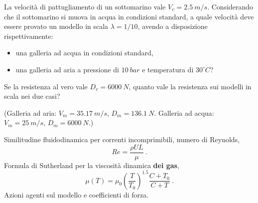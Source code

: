 \noindent
\begin{exerciseS}
La velocit\`{a} di pattugliamento di un sottomarino vale $V_v = 2.5\ m/s$.
Considerando che il sottomarino si muova in acqua in condizioni standard, a quale velocit\`{a}
deve essere provato un modello in scala $\lambda = 1/10$, avendo a disposizione
rispettivamente:
\begin{itemize}
  \item una galleria ad acqua in condizioni standard,
  \item una galleria ad aria a pressione di $10 \ bar$ e temperatura di 
        $30^\circ  C$?
\end{itemize}

Se la resistenza al vero vale $D_v=6000\ N$, quanto vale la resistenza sui
modelli in scala nei due casi?

(Galleria ad aria: $V_m = 35.17\  m/s$, $D_m = 136.1\ N$. 
 Galleria ad acqua: $V_m = 25\  m/s$, $D_m = 6000\ N$.)
\end{exerciseS}

\sol

\partone
Similitudine fluidodinamica per correnti incomprimibili, numero di Reynolds,\vspace{-0.5cm}
\begin{equation}
 Re = \frac{\rho U L}{\mu} \ .
\end{equation}
Formula di Sutherland per la viscosità dinamica \textbf{dei gas},
\begin{equation}
 \mu(T) = \mu_0 \displaystyle\left(\frac{T}{T_0}\right)^{1.5}
 \frac{C+T_0}{C+T} \ .
\end{equation}
Azioni agenti sul modello e coefficienti di forza.

